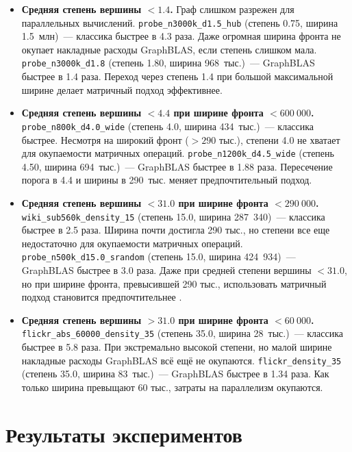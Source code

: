 \documentclass[a4paper]{article}
\begin{document}
\begin{itemize}
    \item \textbf{Средняя степень вершины $< 1.4$.} Граф слишком разрежен для параллельных вычислений.
    \texttt{probe\_n3000k\_d1.5\_hub} (степень 0.75, ширина 1.5~млн)~--- классика быстрее в 4.3 раза. Даже огромная ширина фронта не окупает накладные расходы GraphBLAS, если степень слишком мала.
   \texttt{probe\_n3000k\_d1.8} (степень 1.80, ширина 968~тыс.)~--- GraphBLAS быстрее в 1.4 раза. Переход через степень 1.4 при большой максимальной ширине делает матричный подход эффективнее.

    \item \textbf{Средняя степень вершины $< 4.4$ при ширине фронта $< 600~000$.}
    \texttt{probe\_n800k\_d4.0\_wide} (степень 4.0, ширина 434~тыс.)~--- классика быстрее. Несмотря на широкий фронт ($>290$ тыс.), степени 4.0 не хватает для окупаемости матричных операций.
    \texttt{probe\_n1200k\_d4.5\_wide} (степень 4.50, ширина 694~тыс.)~--- GraphBLAS быстрее в 1.88 раза. Пересечение порога в 4.4 и ширины в 290~тыс. меняет предпочтительный подход.

    \item \textbf{Средняя степень вершины $< 31.0$ при ширине фронта $< 290~000$.}
    \texttt{wiki\_sub560k\_density\_15} (степень 15.0, ширина 287~340)~--- классика быстрее в 2.5 раза. Ширина почти достигла 290 тыс., но степени все еще недостаточно для окупаемости матричных операций.
     \texttt{probe\_n500k\_d15.0\_srandom} (степень 15.0, ширина 424~934)~--- GraphBLAS быстрее в 3.0 раза. Даже при средней степени вершины $< 31.0$, но при ширине фронта, превысившей 290 тыс., использовать матричный подход становится предпочтительнее .

    \item \textbf{Средняя степень вершины $> 31.0$ при ширине фронта $< 60~000$.}
    \texttt{flickr\_abs\_60000\_density\_35} (степень 35.0, ширина 28~тыс.)~--- классика быстрее в 5.8 раза. При экстремально высокой степени, но малой ширине накладные расходы GraphBLAS всё ещё не окупаются.
    \texttt{flickr\_density\_35} (степень 35.0, ширина 83~тыс.)~--- GraphBLAS быстрее в 1.34 раза. Как только ширина превыщают 60 тыс., затраты на параллелизм окупаются.
\end{itemize}

\section{Результаты экспериментов}
\end{document}

